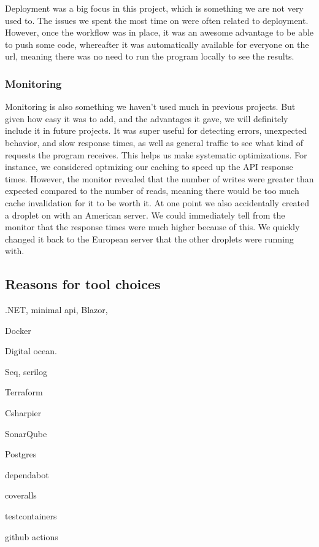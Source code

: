 Deployment was a big focus in this project, 
which is something we are not very used to.
The issues we spent the most time on were often related to deployment.
However, once the workflow was in place, it was
an awesome advantage to be able to push some code,
whereafter it was automatically available for everyone on the url, 
meaning there was no need to run the program locally to see the results.

\subsubsection{Monitoring}

Monitoring is also something we haven't used much in previous projects.
But given how easy it was to add, and the advantages it gave,
we will definitely include it in future projects.
It was super useful for detecting errors, unexpected behavior,
and slow response times, as well as general traffic to see 
what kind of requests the program receives.
This helps us make systematic optimizations. For instance,
we considered optmizing our caching to speed up the API response times.
However, the monitor revealed that the number of writes were
greater than expected compared to the number of reads,
meaning there would be too much cache invalidation for it to be worth it.
At one point we also accidentally created a droplet on with an American server.
We could immediately tell from the monitor that the response 
times were much higher because of this.
We quickly changed it back to the European server 
that the other droplets were running with.

\subsection{Reasons for tool choices}

.NET, minimal api, Blazor,

Docker

Digital ocean.

Seq, serilog

Terraform

Csharpier

SonarQube

Postgres

dependabot

coveralls

testcontainers

github actions